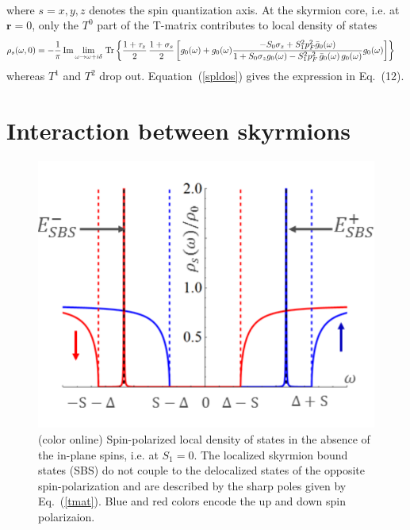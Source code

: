 \documentclass[twocolumn,showpacs,floatfix,longbibliography]{revtex4-1}
\begin{document}
\begin{widetext}
\begin{align}
\end{align}
where $s=x,y,z$ denotes the spin quantization axis. At the skyrmion core, i.e. at $\bm r=0$, only the $T^0$ part of the T-matrix contributes to local density of states 
\begin{align}
	& \rho_s(\omega,0) = -\frac{1}{\pi}\,{\rm Im}\lim_{\omega\rightarrow \omega+i\delta}{\rm \,Tr} \left\{  \frac{1+\tau_z}{2}\,\frac{1+\sigma_s}{2}  \left[g_0(\omega)+g_0(\omega)  \frac{-S_0\sigma_z+S^2_1p_F^2\bar g_{0}(\omega)}{1+S_0\sigma_zg_{0}(\omega)-S^2_1p_F^2\,\bar g_{0}(\omega)\, g_{0}(\omega)} g_0(\omega)  \right]\right\}\,  \label{spldos}
\end{align}
whereas  $T^1$ and $T^2$ drop out. Equation~(\ref{spldos}) gives the expression in Eq.~(12).

\section{Interaction between skyrmions}


\begin{figure} \centering
	\includegraphics[width=0.35\linewidth]{fig5}	
	\caption{(color online) Spin-polarized local density of states in the absence of the in-plane spins, i.e. at $S_1 = 0$. The localized skyrmion bound states (SBS) do not couple to the delocalized states of the opposite spin-polarization and are described by the sharp poles given by Eq.~(\ref{tmat}). Blue and red colors encode the up and down spin polarizaion.} \label{fig:SPLDOS}
\end{figure}


\end{widetext}
\end{document}
